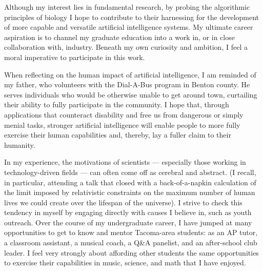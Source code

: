 Although my interest lies in fundamental research, by probing the algorithmic principles of biology I hope to contribute to their harnessing for the development of more capable and versatile artificial intelligence systems.
My ultimate career aspiration is to channel my graduate education into a work in, or in close collaboration with, industry.
Beneath my own curiosity and ambition, I feel a moral imperative to participate in this work.

When reflecting on the human impact of artificial intelligence, I am reminded of my father, who volunteers with the Dial-A-Bus program in Benton county.
He serves individuals who would be otherwise unable to get around town, curtailing their ability to fully participate in the community.
I hope that, through applications that counteract disability and free us from dangerous or simply menial tasks, stronger artificial intelligence will enable people to more fully exercise their human capabilities and, thereby, lay a fuller claim to their humanity.

In my experience, the motivations of scientists --- especially those working in technology-driven fields --- can often come off as cerebral and abstract.
(I recall, in particular, attending a talk that closed with a back-of-a-napkin calculation of the limit imposed by relativistic constraints on the maximum number of human lives we could create over the lifespan of the universe).
I strive to check this tendency in myself by engaging directly with causes I believe in, such as youth outreach.
Over the course of my undergraduate career, I have jumped at many opportunities to get to know and mentor Tacoma-area students: as an AP tutor, a classroom assistant, a musical coach, a Q\&A panelist, and an after-school club leader.
I feel very strongly about affording other students the same opportunities to exercise their capabilities in music, science, and math that I have enjoyed.
